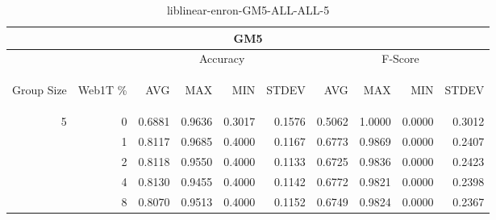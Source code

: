 \begin{center}
\begin{table}[htbp] 
 \begin{center}
\begin{tabular}{ | r | r | r | r | r | r | r | r | r | r |}
\hline
\multicolumn{10}{|c|}{GM5}\\
\hline
 & & \multicolumn{4}{|c|}{Accuracy} & \multicolumn{4}{|c|}{F-Score}\\ \cline{3-10}
\begin{sideways}Group Size\end{sideways} & \begin{sideways}Web1T \%\end{sideways} & \begin{sideways}AVG\end{sideways} & \begin{sideways}MAX\end{sideways} & \begin{sideways}MIN\end{sideways} & \begin{sideways}STDEV\end{sideways} & \begin{sideways}AVG\end{sideways} & \begin{sideways}MAX\end{sideways} & \begin{sideways}MIN\end{sideways} & \begin{sideways}STDEV\end{sideways}\\
\hline
\multirow{4}{*}{5}
 & 0 & 0.6881 & 0.9636 & 0.3017 & 0.1576 & 0.5062 & 1.0000 & 0.0000 & 0.3012\\ \cline{2-10}
 & 1 & 0.8117 & 0.9685 & 0.4000 & 0.1167 & 0.6773 & 0.9869 & 0.0000 & 0.2407\\ \cline{2-10}
 & 2 & 0.8118 & 0.9550 & 0.4000 & 0.1133 & 0.6725 & 0.9836 & 0.0000 & 0.2423\\ \cline{2-10}
 & 4 & 0.8130 & 0.9455 & 0.4000 & 0.1142 & 0.6772 & 0.9821 & 0.0000 & 0.2398\\ \cline{2-10}
 & 8 & 0.8070 & 0.9513 & 0.4000 & 0.1152 & 0.6749 & 0.9824 & 0.0000 & 0.2367\\ \cline{2-10}
\hline
\end{tabular}
\caption{liblinear-enron-GM5-ALL-ALL-5}
\label{table:liblinear-enron-GM5-ALL-ALL-5}
\end{center}
 \end{table}
\end{center}

